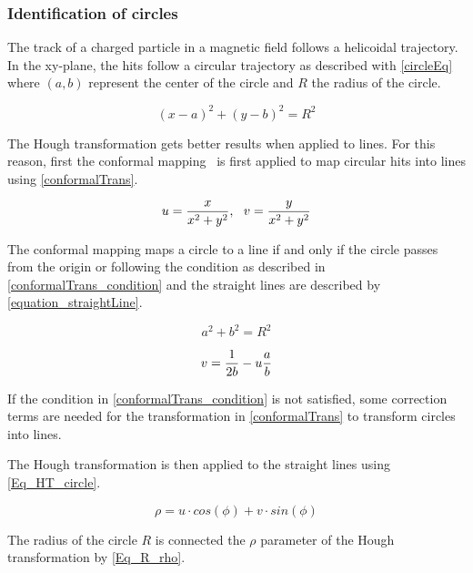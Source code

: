 \subsubsection{Identification of circles}

The track of a charged particle in a magnetic field follows a helicoidal trajectory. In the xy-plane, the hits follow a circular trajectory as described with \cref{circleEq} where $(a, b)$ represent the center of the circle and $R$ the radius of the circle.

\begin{equation}
  {(x-a)}^2 + {(y-b)}^2 = R^2
	\label{circleEq}
\end{equation}

The Hough transformation gets better results when applied to lines. For this reason, first the conformal mapping~\cite{Hansroul:1988wa} is first applied to map circular hits into lines using \cref{conformalTrans}.

\begin{equation}
  u = {{x} \over {x^2+y^2}} , \,\,\,\, v = {{y} \over {x^2+y^2}}
	\label{conformalTrans}
\end{equation}

The conformal mapping maps a circle to a line if and only if the circle passes from the origin or following the condition as described in \cref{conformalTrans_condition} and the straight lines are described by \cref{equation_straightLine}.

\begin{equation}
  a^2 + b^2 = R^2
	\label{conformalTrans_condition}
\end{equation}

\begin{equation}
  v = {1 \over {2b}} - u {a \over b}
	\label{equation_straightLine}
\end{equation}

If the condition in \cref{conformalTrans_condition} is not satisfied, some correction terms are needed for the transformation in \cref{conformalTrans} to transform circles into lines.

The Hough transformation is then applied to the straight lines using \cref{Eq_HT_circle}.

\begin{equation}
	\rho = u \cdot cos(\phi) + v \cdot sin(\phi)
	\label{Eq_HT_circle}
\end{equation}

The radius of the circle $R$ is connected the $\rho$ parameter of the Hough transformation by \cref{Eq_R_rho}.

